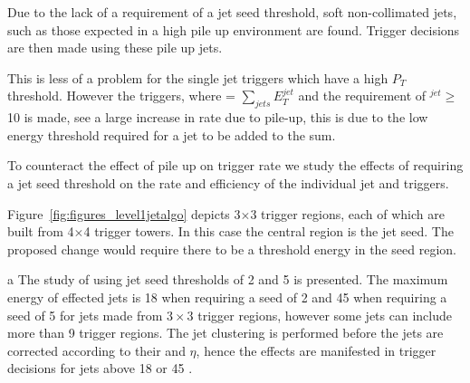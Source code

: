 Due to the lack of a requirement of a jet seed threshold, soft non-collimated jets, such as
those expected in a high pile up environment are found. Trigger decisions are then made using these pile up jets.

This is less of a problem for the single jet triggers which have a high $P_{T}$ threshold.
However the \HT triggers, where \HT = $\sum_{jets}E_{T}^{jet}$ and the requirement of \ET$^{jet} \geq $10 \GeV is made,
see a large increase in rate due to pile-up, this is due to the low energy threshold required for a jet to be added to the \HT sum.

To counteract the effect of pile up on trigger rate we study the effects of requiring a jet
seed threshold on the rate and efficiency of the individual jet and \HT triggers.

Figure~\ref{fig:figures_level1jetalgo} depicts 3$\times$3 trigger regions, each of which are built from 4$\times$4 trigger towers.
In this case the central region is the jet seed. The proposed change would require there to be a threshold energy in the seed
region.

a
The study of using jet seed thresholds of 2 and 5 \GeV is presented. The maximum energy of effected jets is 18 \GeV when 
requiring a seed of 2 \GeV and 45 \GeV when requiring a seed of 5 \GeV for jets made from $3\times3$ trigger regions, however 
some jets can include more than 9 trigger regions. The jet clustering is performed before the \Lone jets are corrected according 
to their \ET and $\eta$, hence the effects are manifested in trigger decisions for \Lone jets above 18 or 45 \GeV.



